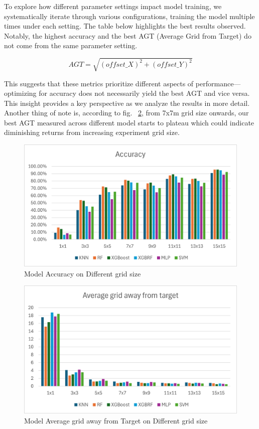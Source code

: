 \documentclass[runningheads]{llncs}
\begin{document}
To explore how different parameter settings impact model training, we systematically iterate through various configurations, training the model multiple times under each setting. The table below highlights the best results observed. Notably, the highest accuracy and the best AGT (Average Grid from Target) do not come from the same parameter setting.

\begin{equation}
	AGT = \sqrt{(offset\_X)^2 + (offset\_Y)^2} 
\end{equation}


This suggests that these metrics prioritize different aspects of performance—optimizing for accuracy does not necessarily yield the best AGT and vice versa. This insight provides a key perspective as we analyze the results in more detail. Another thing of note is, according to fig. ~\ref{fig:AGT_dgrid_size}, from 7x7m grid size onwards, our best AGT measured across different model starts to plateau which could indicate diminishing returns from increasing experiment grid size.

\begin{figure}[htbp]
	\centerline{\includegraphics[scale=0.65]{image3.png}}
	\caption{Model Accuracy on Different grid size}
	\label{fig:acc_dgird_size}
\end{figure}

\begin{figure}[htbp]
	\centerline{\includegraphics[scale=0.65]{image1.png}}
	\caption{Model Average grid away from Target on Different grid size}
	\label{fig:AGT_dgrid_size}
\end{figure}
\end{document}
